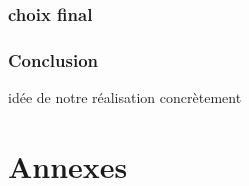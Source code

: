 \documentclass[paper=a4,12pt]{article}
\numberwithin{equation}{section}		%
\numberwithin{figure}{section}			%
\numberwithin{table}{section}				%
\begin{document}
\section{choix final}


\section{Conclusion}
idée de notre réalisation concrètement


  \newpage

%  
%  
%
  \appendix
  \part*{Annexes}
  
  

  
  

 


\end{document}
